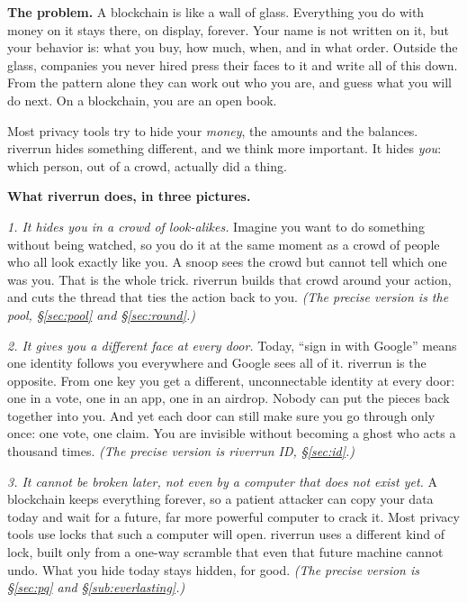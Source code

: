 \documentclass[11pt]{article}
\begin{document}
\vspace{0.4em}
\textbf{The problem.} A blockchain is like a wall of glass. Everything you do with money
on it stays there, on display, forever. Your name is not written on it, but your
behavior is: what you buy, how much, when, and in what order. Outside the glass,
companies you never hired press their faces to it and write all of this down. From the
pattern alone they can work out who you are, and guess what you will do next. On a
blockchain, you are an open book.

Most privacy tools try to hide your \emph{money}, the amounts and the balances. riverrun
hides something different, and we think more important. It hides \emph{you}: which
person, out of a crowd, actually did a thing.

\vspace{0.3em}
\textbf{What riverrun does, in three pictures.}

\emph{1. It hides you in a crowd of look-alikes.} Imagine you want to do something
without being watched, so you do it at the same moment as a crowd of people who all look
exactly like you. A snoop sees the crowd but cannot tell which one was you. That is the
whole trick. riverrun builds that crowd around your action, and cuts the thread that
ties the action back to you. \emph{(The precise version is the pool, \S\ref{sec:pool}
and \S\ref{sec:round}.)}

\emph{2. It gives you a different face at every door.} Today, ``sign in with Google''
means one identity follows you everywhere and Google sees all of it. riverrun is the
opposite. From one key you get a different, unconnectable identity at every door: one in
a vote, one in an app, one in an airdrop. Nobody can put the pieces back together into
you. And yet each door can still make sure you go through only once: one vote, one claim.
You are invisible without becoming a ghost who acts a thousand times. \emph{(The precise
version is riverrun ID, \S\ref{sec:id}.)}

\emph{3. It cannot be broken later, not even by a computer that does not exist yet.} A
blockchain keeps everything forever, so a patient attacker can copy your data today and
wait for a future, far more powerful computer to crack it. Most privacy tools use locks
that such a computer will open. riverrun uses a different kind of lock, built only from a
one-way scramble that even that future machine cannot undo. What you hide today stays
hidden, for good. \emph{(The precise version is \S\ref{sec:pq} and
\S\ref{sub:everlasting}.)}
\end{document}
